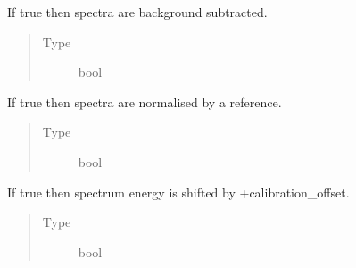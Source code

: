 \documentclass[a4paper,10pt,english]{sphinxmanual}
\begin{document}
\begin{fulllineitems}
\begin{fulllineitems}
\end{fulllineitems}


\begin{fulllineitems}
\label{\detokenize{sfgtools:sfgtools.SFGProcessTools.subtract_check}}
\sphinxAtStartPar
If true then spectra are background subtracted.
\begin{quote}\begin{description}
\item[{Type}] \leavevmode
\sphinxAtStartPar
bool

\end{description}\end{quote}

\end{fulllineitems}


\begin{fulllineitems}
\label{\detokenize{sfgtools:sfgtools.SFGProcessTools.normalise_check}}
\sphinxAtStartPar
If true then spectra are normalised by a reference.
\begin{quote}\begin{description}
\item[{Type}] \leavevmode
\sphinxAtStartPar
bool

\end{description}\end{quote}

\end{fulllineitems}


\begin{fulllineitems}
\label{\detokenize{sfgtools:sfgtools.SFGProcessTools.calibrate_check}}
\sphinxAtStartPar
If true then spectrum energy is shifted by +calibration\_offset.
\begin{quote}\begin{description}
\item[{Type}] \leavevmode
\sphinxAtStartPar
bool


\end{description}
\end{quote}
\end{fulllineitems}
\end{fulllineitems}
\end{document}
